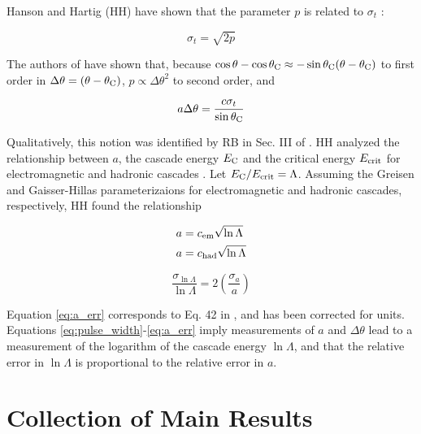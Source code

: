 \documentclass[amsmath,amssymb,aps,prd,10pt,twocolumn,showkeys]{revtex4}
\begin{document}
\begin{itemize}
Hanson and Hartig (HH) have shown that the parameter $p$ is related to $\sigma_t$ \cite{PhysRevD.105.123019}:

\begin{equation}
\sigma_t = \sqrt{2p} \label{eq:pulse_width}
\end{equation}

The authors of \cite{PhysRevD.105.123019} have shown that, because $\cos\theta - \cos\theta_{\rm C} \approx -\sin\theta_{\rm C}(\theta-\theta_{\rm C})$ to first order in $\Delta\theta=(\theta-\theta_{\rm C})$, $p \propto \Delta\theta^2$ to second order, and 

\begin{equation}
a\Delta\theta = \frac{c \sigma_t}{\sin\theta_{\rm C}} \label{eq:uncert}
\end{equation}

Qualitatively, this notion was identified by RB in Sec. III of \cite{10.1103/physrevd.65.016003}.  HH analyzed the relationship between $a$, the cascade energy $E_{\rm C}$ and the critical energy $E_{\rm crit}$ for electromagnetic and hadronic cascades \cite{PhysRevD.105.123019}.  Let $E_{\rm C}/E_{\rm crit} = \Lambda$.  Assuming the Greisen and Gaisser-Hillas parameterizaions for electromagnetic and hadronic cascades, respectively, HH found the relationship

\begin{align}
a &= c_{\rm em} \sqrt{\ln\Lambda} \label{eq:em} \\
a &= c_{\rm had} \sqrt{\ln\Lambda} \label{eq:had}
\end{align}

\begin{equation}
\frac{\sigma_{\ln\Lambda}}{\ln\Lambda} = 2\left(\frac{\sigma_a}{a}\right) \label{eq:a_err}
\end{equation}

Equation \ref{eq:a_err} corresponds to Eq. 42 in \cite{PhysRevD.105.123019}, and has been corrected for units.  Equations \ref{eq:pulse_width}-\ref{eq:a_err} imply measurements of $a$ and $\Delta\theta$ lead to a measurement of the logarithm of the cascade energy $\ln\Lambda$, and that the relative error in $\ln\Lambda$ is proportional to the relative error in $a$.
\end{itemize}

\section{Collection of Main Results}
\label{sec:onc}
\end{document}
